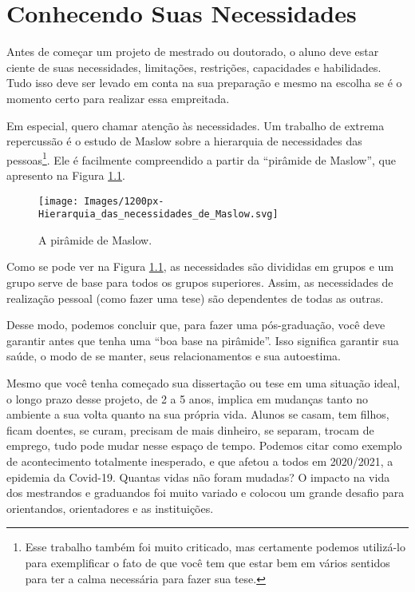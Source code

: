 \chapter{Conhecendo Suas Necessidades}

Antes de começar um projeto de mestrado ou doutorado, o aluno deve estar ciente de suas necessidades, limitações, restrições, capacidades e habilidades. Tudo isso deve ser levado em conta na sua preparação e mesmo na escolha se é o momento certo para realizar essa empreitada.

Em especial, quero chamar atenção às necessidades. Um trabalho de extrema repercussão é o estudo de Maslow  sobre a hierarquia de necessidades das pessoas\footnote{Esse trabalho também foi muito criticado, mas certamente podemos utilizá-lo para exemplificar o fato de que você tem que estar bem em vários sentidos para ter a calma necessária para fazer sua tese.}. Ele é facilmente compreendido a partir da “pirâmide de Maslow”, que apresento na Figura \ref{fig:maslow}.

\begin{figure}
	\centering
	\texttt{[image: Images/1200px-Hierarquia\_das\_necessidades\_de\_Maslow.svg]}
	\caption{A pirâmide de Maslow.}
	\label{fig:maslow}
\end{figure}


Como se pode ver na Figura \ref{fig:maslow}, as necessidades são divididas em grupos e um grupo serve de base para todos os grupos superiores. Assim, as necessidades de realização pessoal (como fazer uma tese) são dependentes de todas as outras. 

Desse modo, podemos concluir que, para fazer uma pós-graduação, você deve garantir antes que tenha uma “boa base na pirâmide”. Isso significa garantir sua saúde, o modo de se manter, seus relacionamentos e sua autoestima.

Mesmo que você tenha começado sua dissertação ou tese em uma situação ideal, o longo prazo desse projeto, de 2 a 5 anos, implica em mudanças tanto no ambiente a sua volta quanto na sua própria vida. Alunos se casam, tem filhos, ficam doentes, se curam, precisam de mais dinheiro, se separam, trocam de emprego, tudo pode mudar nesse espaço de tempo.
Podemos citar como exemplo de acontecimento totalmente inesperado, e que afetou a todos em 2020/2021, a epidemia da Covid-19. Quantas vidas não foram mudadas? O impacto na vida dos mestrandos e graduandos foi muito variado e colocou um grande desafio para orientandos, orientadores e as instituições.

